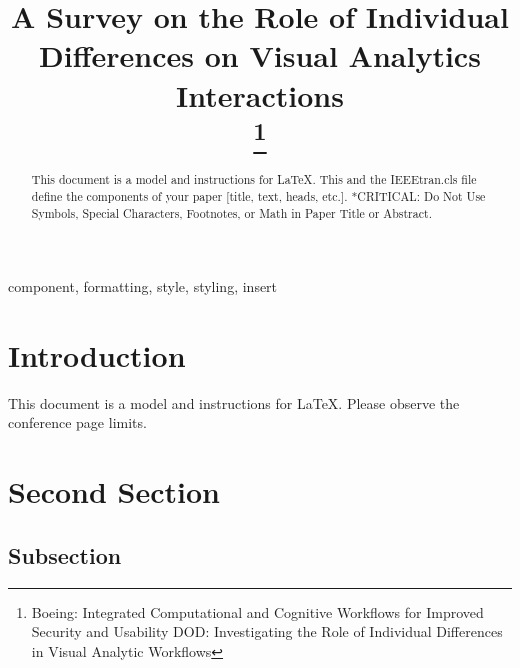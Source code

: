 \documentclass[conference]{IEEEtran}
\begin{document}
\title{A Survey on the Role of Individual Differences on Visual
Analytics Interactions\\
\thanks{
    Boeing: Integrated Computational and Cognitive Workflows for
Improved Security and Usability \newline
DOD: Investigating the Role of Individual Differences in Visual Analytic Workflows
}
}

\author{
\and
{}

}

\maketitle

\begin{abstract}
This document is a model and instructions for \LaTeX.
This and the IEEEtran.cls file define the components of your paper [title, text, heads, etc.]. *CRITICAL: Do Not Use Symbols, Special Characters, Footnotes, 
or Math in Paper Title or Abstract.
\end{abstract}

\begin{IEEEkeywords}
component, formatting, style, styling, insert
\end{IEEEkeywords}

\section{Introduction}\label{Intro}
This document is a model and instructions for \LaTeX.
Please observe the conference page limits. 

\section{Second Section}

\subsection{Subsection}

\cite{b1}



\vspace{12pt}
\end{document}

